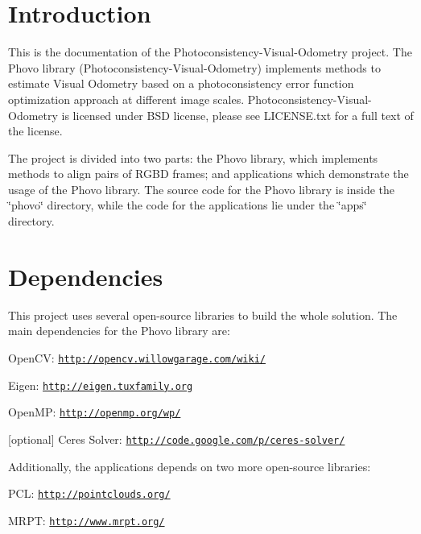 \hypertarget{index_intro_sec}{}\section{Introduction}\label{index_intro_sec}
This is the documentation of the Photoconsistency-\/Visual-\/Odometry project. The Phovo library (Photoconsistency-\/Visual-\/Odometry) implements methods to estimate Visual Odometry based on a photoconsistency error function optimization approach at different image scales. Photoconsistency-\/Visual-\/Odometry is licensed under BSD license, please see LICENSE.txt for a full text of the license.

The project is divided into two parts: the Phovo library, which implements methods to align pairs of RGBD frames; and applications which demonstrate the usage of the Phovo library. The source code for the Phovo library is inside the \char`\"{}phovo\char`\"{} directory, while the code for the applications lie under the \char`\"{}apps\char`\"{} directory.

 \hypertarget{index_dependencies_sec}{}\section{Dependencies}\label{index_dependencies_sec}
This project uses several open-\/source libraries to build the whole solution. The main dependencies for the Phovo library are:
\begin{DoxyItemize}
\item OpenCV: \href{http://opencv.willowgarage.com/wiki/}{\tt http://opencv.willowgarage.com/wiki/}
\item Eigen: \href{http://eigen.tuxfamily.org}{\tt http://eigen.tuxfamily.org}
\item OpenMP: \href{http://openmp.org/wp/}{\tt http://openmp.org/wp/}
\item \mbox{[}optional\mbox{]} Ceres Solver: \href{http://code.google.com/p/ceres-solver/}{\tt http://code.google.com/p/ceres-\/solver/}
\end{DoxyItemize}

Additionally, the applications depends on two more open-\/source libraries:


\begin{DoxyItemize}
\item PCL: \href{http://pointclouds.org/}{\tt http://pointclouds.org/}
\item MRPT: \href{http://www.mrpt.org/}{\tt http://www.mrpt.org/}
\end{DoxyItemize}

